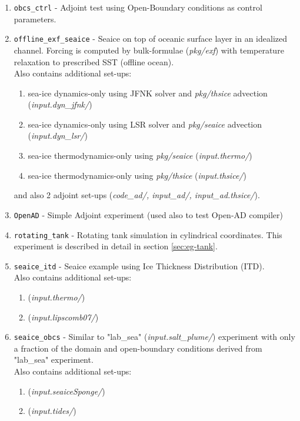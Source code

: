 \begin{enumerate}
\item \texttt{obcs\_ctrl} - Adjoint test using Open-Boundary conditions
  as control parameters.

\item \texttt{offline\_exf\_seaice} - Seaice on top of oceanic surface layer
  in an idealized channel. Forcing is computed by bulk-formulae ({\it pkg/exf})
  with temperature relaxation to prescribed SST (offline ocean).\\
  Also contains additional set-ups:
  \begin{enumerate}
   \item sea-ice dynamics-only using JFNK solver
         and {\it pkg/thsice} advection ({\it input.dyn\_jfnk/})
   \item sea-ice dynamics-only using LSR solver
         and {\it pkg/seaice} advection ({\it input.dyn\_lsr/})
   \item sea-ice thermodynamics-only using {\it pkg/seaice} ({\it input.thermo/})
   \item sea-ice thermodynamics-only using {\it pkg/thsice} ({\it input.thsice/})
  \end{enumerate}
  and also 2 adjoint set-ups ({\it code\_ad/, input\_ad/, input\_ad.thsice/}).

\item \texttt{OpenAD} - Simple Adjoint experiment (used also to test
  Open-AD compiler)

\item \texttt{rotating\_tank} - Rotating tank simulation in cylindrical
  coordinates.  This experiment is described in detail in section
  \ref{sec:eg-tank}.

\item \texttt{seaice\_itd} - Seaice example using Ice Thickness Distribution (ITD).\\
  Also contains additional set-ups:
  \begin{enumerate}
   \item ({\it input.thermo/})
   \item ({\it input.lipscomb07/})
  \end{enumerate}

\item \texttt{seaice\_obcs} - Similar to "lab\_sea" ({\it input.salt\_plume/})
  experiment with only a fraction of the domain and open-boundary conditions
  derived from "lab\_sea" experiment.\\
  Also contains additional set-ups:
  \begin{enumerate}
   \item ({\it input.seaiceSponge/})
   \item ({\it input.tides/})
  \end{enumerate}


\end{enumerate}
